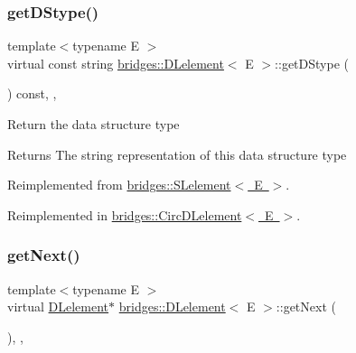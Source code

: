 \subsubsection{\texorpdfstring{get\+D\+Stype()}{getDStype()}}
{\footnotesize\ttfamily template$<$typename E $>$ \\
virtual const string \mbox{\hyperlink{classbridges_1_1_d_lelement}{bridges\+::\+D\+Lelement}}$<$ E $>$\+::get\+D\+Stype (\begin{DoxyParamCaption}{ }\end{DoxyParamCaption}) const\hspace{0.3cm}{\ttfamily [inline]}, {\ttfamily [override]}, {\ttfamily [virtual]}}

Return the data structure type

\begin{DoxyReturn}{Returns}
The string representation of this data structure type 
\end{DoxyReturn}


Reimplemented from \mbox{\hyperlink{classbridges_1_1_s_lelement_a136330b3481a47b3edb429f323274655}{bridges\+::\+S\+Lelement$<$ E $>$}}.



Reimplemented in \mbox{\hyperlink{classbridges_1_1_circ_d_lelement_a0e199fe681755df694807261ce2460c2}{bridges\+::\+Circ\+D\+Lelement$<$ E $>$}}.

\mbox{\label{classbridges_1_1_d_lelement_a0c713707d8c7d0a97fe4194ed6592ede}} 
\subsubsection{\texorpdfstring{get\+Next()}{getNext()}\hspace{0.1cm}{\footnotesize\ttfamily [1/2]}}
{\footnotesize\ttfamily template$<$typename E $>$ \\
virtual \mbox{\hyperlink{classbridges_1_1_d_lelement}{D\+Lelement}}$\ast$ \mbox{\hyperlink{classbridges_1_1_d_lelement}{bridges\+::\+D\+Lelement}}$<$ E $>$\+::get\+Next (\begin{DoxyParamCaption}{ }\end{DoxyParamCaption})\hspace{0.3cm}{\ttfamily [inline]}, {\ttfamily [override]}, {\ttfamily [virtual]}}

